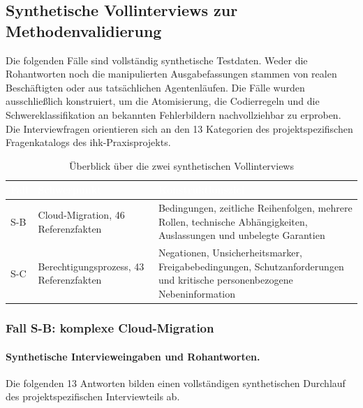 \documentclass[
  10pt,
  ngerman,
  a4paper,
  toc=graduated,
  numbers=noenddot,
  headings=standardclasses,
  nonumberlist
]{scrartcl}
\begin{document}
\clearpage
\subsection{Synthetische Vollinterviews zur Methodenvalidierung}
\label{anhang_synth_interviews}

Die folgenden Fälle sind vollständig synthetische Testdaten. Weder die Rohantworten noch die manipulierten Ausgabefassungen stammen von realen Beschäftigten oder aus tatsächlichen Agentenläufen. Die Fälle wurden ausschließlich konstruiert, um die Atomisierung, die Codierregeln und die Schwereklassifikation an bekannten Fehlerbildern nachvollziehbar zu erproben. Die Interviewfragen orientieren sich an den 13 Kategorien des projektspezifischen Fragenkatalogs des \acrshort{ihk}-Praxisprojekts.

\begin{table}[H]
\centering
\small
\begin{tabularx}{\textwidth}{L{1.0cm}L{4.0cm}Y}
\toprule
{}
\textcolor{white}{\textbf{Fall}} & \textcolor{white}{\textbf{Schwerpunkt}} & \textcolor{white}{\textbf{Konstruktionsziel}}\\
\midrule
S-B & Cloud-Migration, 46 Referenzfakten & Bedingungen, zeitliche Reihenfolgen, mehrere Rollen, technische Abhängigkeiten, Auslassungen und unbelegte Garantien\\
S-C & Berechtigungsprozess, 43 Referenzfakten & Negationen, Unsicherheitsmarker, Freigabebedingungen, Schutzanforderungen und kritische personenbezogene Nebeninformation\\
\bottomrule
\end{tabularx}
\caption{Überblick über die zwei synthetischen Vollinterviews}
\label{tab:synth_vollinterviews}
\end{table}

\subsubsection{Fall S-B: komplexe Cloud-Migration}
\label{anhang_synth_sb}

\paragraph{Synthetische Intervieweingaben und Rohantworten.}
Die folgenden 13 Antworten bilden einen vollständigen synthetischen Durchlauf des projektspezifischen Interviewteils ab.
\end{document}
